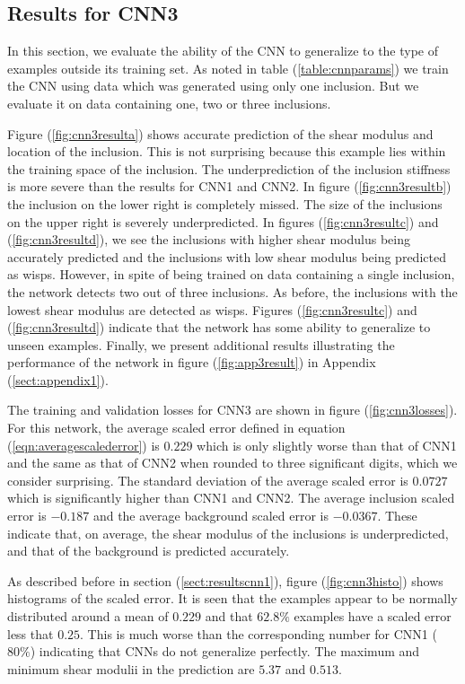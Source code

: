\documentclass[12pt]{article}
\begin{document}
\subsection{\label{sect:resultscnn3}Results for CNN3}
In this section, we evaluate the ability of the CNN to generalize to the type of examples outside its training set. As noted in table (\ref{table:cnnparams}) we train the CNN using data which was generated using only one inclusion. But we evaluate it on data containing one, two or three inclusions.

Figure (\ref{fig:cnn3resulta}) shows accurate prediction of the shear modulus and location of the inclusion. This is not surprising because this example lies within the training space of the inclusion. The underprediction of the inclusion stiffness is more severe than the results for CNN1 and CNN2. In figure (\ref{fig:cnn3resultb}) the inclusion on the lower right is completely missed. The size of the inclusions on the upper right is severely underpredicted. In figures (\ref{fig:cnn3resultc}) and (\ref{fig:cnn3resultd}), we see the inclusions with higher shear modulus being accurately predicted and the inclusions with low shear modulus being predicted as wisps. However, in spite of being trained on data containing a single inclusion, the network detects two out of three inclusions. As before, the inclusions with the lowest shear modulus are detected as wisps. Figures (\ref{fig:cnn3resultc}) and (\ref{fig:cnn3resultd}) indicate that the network has some ability to generalize to unseen examples. Finally, we present additional results illustrating the performance of the network in figure (\ref{fig:app3result}) in Appendix (\ref{sect:appendix1}).

The training and validation losses for CNN3 are shown in figure (\ref{fig:cnn3losses}). For this network, the average scaled error defined in equation (\ref{eqn:averagescalederror}) is $0.229$ which is only slightly worse than that of CNN1 and the same as that of CNN2 when rounded to three significant digits, which we consider surprising. The standard deviation of the average scaled error is $0.0727$ which is significantly higher than CNN1 and CNN2. The average inclusion scaled error is $-0.187$ and the average background scaled error is $-0.0367$. These indicate that, on average, the shear modulus of the inclusions is underpredicted, and that of the background is predicted accurately.

As described before in section (\ref{sect:resultscnn1}), figure (\ref{fig:cnn3histo}) shows histograms of the scaled error. It is seen that the examples appear to be normally distributed around a mean of ${0.229}$ and that $62.8\%$ examples have a scaled error less that $0.25$. This is much worse than the corresponding number for CNN1 ($80\%$) indicating that CNNs do not generalize perfectly. The maximum and minimum shear modulii in the prediction are $5.37$ and $0.513$.
\end{document}
